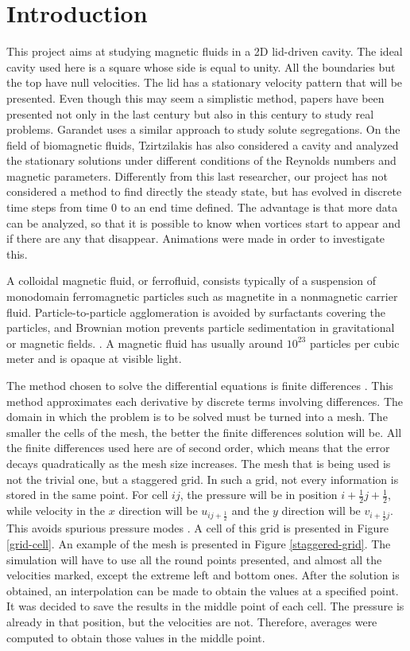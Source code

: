 \documentclass[journal]{IEEEtran}
\begin{document}
\section{Introduction}
This project aims at studying magnetic fluids in a 2D lid-driven cavity. The ideal cavity used here is a square whose side is equal to unity. All the boundaries but the top have null velocities. The lid has a stationary velocity pattern that will be presented. Even though this may seem a simplistic method, papers have been presented not only in the last century but also in this century to study real problems. Garandet \cite{Garandet2012149} uses a similar approach to study solute segregations. On the field of biomagnetic fluids, Tzirtzilakis \cite{Tzirtzilakis2013} has also considered a cavity and analyzed the stationary solutions under different conditions of the Reynolds numbers and magnetic parameters. Differently from this last researcher, our project has not considered a method to find directly the steady state, but has evolved in discrete time steps from time 0 to an end time defined. The advantage is that more data can be analyzed, so that it is possible to know when vortices start to appear and if there are any that disappear. Animations were made in order to investigate this.

A colloidal magnetic fluid, or ferrofluid, consists typically of a suspension of monodomain ferromagnetic particles such as magnetite in a nonmagnetic carrier fluid. Particle-to-particle agglomeration is avoided by surfactants covering the particles, and Brownian motion prevents particle sedimentation in gravitational or magnetic fields.  \cite{RosensweigMagneticFluids}. A magnetic fluid has usually around $10^{23}$ particles per cubic meter and is opaque at visible light.

The method chosen to solve the differential equations is finite differences \cite{zbMATH03010997}. This method approximates each derivative by discrete terms involving differences. The domain in which the problem is to be solved must be turned into a mesh. The smaller the cells of the mesh, the better the finite differences solution will be. All the finite differences used here are of second order, which means that the error decays quadratically as the mesh size increases. The mesh that is being used is not the trivial one, but a staggered grid. In such a grid, not every information is stored in the same point. For cell $ij$, the pressure will be in position $i+\frac{1}{2}j+\frac{1}{2}$, while velocity in the $x$ direction will be $u_{ij+\frac{1}{2}}$ and the $y$ direction will be $v_{i+\frac{1}{2}j}$. This avoids spurious pressure modes \cite{hinchLectureNotes}. A cell of this grid is presented in Figure \ref{grid-cell}. An example of the mesh is presented in Figure \ref{staggered-grid}. The simulation will have to use all the round points presented, and almost all the velocities marked, except the extreme left and bottom ones. After the solution is obtained, an interpolation can be made to obtain the values at a specified point. It was decided to save the results in the middle point of each cell. The pressure is already in that position, but the velocities are not. Therefore, averages were computed to obtain those values in the middle point.
\end{document}
